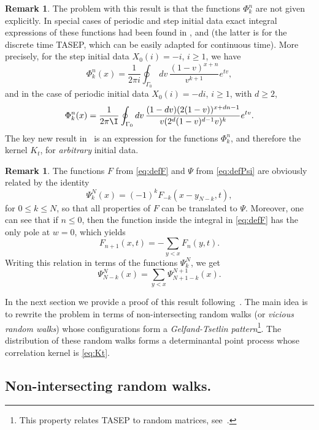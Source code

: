 \documentclass[]{pcmi}
\theoremstyle{plain}
\theoremstyle{definition}
\newtheorem{remark}[equation]{Remark}
\begin{document}
\begin{remark}
 The problem with this result is that the functions $\Phi^n_k$ are not given explicitly. In special cases of periodic and step initial data exact integral expressions of these functions had been found in \cite{borFerPrahSasam}, \cite{ferrariMatr} and \cite{bfp} (the latter is for the discrete time TASEP, which can be easily adapted for continuous time). More precisely, for the step initial data $X_0(i)=-i$, $i\geq1$, we have
\[
	\Phi^n_k(x) = \frac{1}{2 \pi i} \oint_{\Gamma_0} dv\, \frac{(1-v)^{x+n}}{v^{k+1}} e^{t v},
\]
and in the case of periodic initial data $X_0(i)=-d i$, $i\geq1$, with $d \geq 2$,
\[
	\Phi^n_k(x) = \frac{1}{2 \pi \I} \oint_{\Gamma_{0}} dv\, \frac{(1 - d v) (2(1-v))^{x + dn - 1}}{v (2^d (1-v)^{d-1} v)^{k}} e^{t v}.
\]
 The key new result in~\cite{KPZ} is an  expression for the functions $\Phi^n_k$, and therefore the kernel $K_t$, for \emph{arbitrary} initial data.
\end{remark}

\begin{remark}
 The functions $F$ from \eqref{eq:defF} and $\Psi$ from \eqref{eq:defPsi} are obviously related by the identity
\begin{equation}\label{eq:FandPhi}
\Psi^N_{k}(x) =  (-1)^k F_{-k} (x - y_{N - k }, t),
\end{equation}
for $0 \leq k \leq N$, so that all properties of $F$ can be translated to $\Psi$. Moreover, one can see that if $n \leq 0$, then the function inside the integral in \eqref{eq:defF} has the only pole at $w=0$, which yields 
\[
F_{n+1}(x,t)=-\sum_{y < x} F_n(y,t).
\]
Writing this relation in terms of the functions $\Psi^N_{k}$, we get
\begin{equation}\label{eq:PsiRecursion}
\Psi^{N}_{N - k}(x) = \sum_{y < x} \Psi^{N+1}_{N +1 - k}(x).
\end{equation}
\end{remark}

In the next section we provide a proof of this result following~\cite{borFerPrahSasam}. The main idea is to rewrite the problem in terms of non-intersecting random walks (or \emph{vicious random walks}) whose configurations form a \emph{Gelfand-Tsetlin pattern}\footnote{This property relates TASEP to random matrices, see~\cite{ferrariMatr}.}. The distribution of these random walks forms a determinantal point process whose correlation kernel is \eqref{eq:Kt}.

\subsection{Non-intersecting random walks.}
\label{eq:random_walks}
\end{document}
